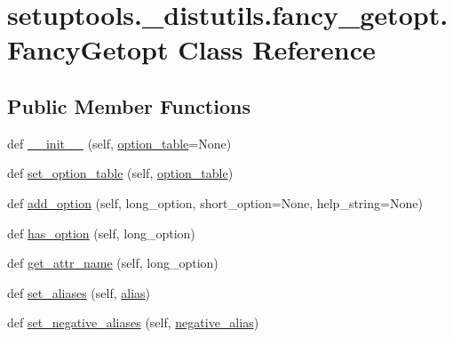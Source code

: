 \hypertarget{classsetuptools_1_1__distutils_1_1fancy__getopt_1_1FancyGetopt}{}\section{setuptools.\+\_\+distutils.\+fancy\+\_\+getopt.\+Fancy\+Getopt Class Reference}
\label{classsetuptools_1_1__distutils_1_1fancy__getopt_1_1FancyGetopt}
\subsection*{Public Member Functions}
\begin{DoxyCompactItemize}
\item 
def \hyperlink{classsetuptools_1_1__distutils_1_1fancy__getopt_1_1FancyGetopt_aff40839af86cf0e7fe54e1c28898233a}{\+\_\+\+\_\+init\+\_\+\+\_\+} (self, \hyperlink{classsetuptools_1_1__distutils_1_1fancy__getopt_1_1FancyGetopt_ab4341d9895b8b93f504df3dea529c456}{option\+\_\+table}=None)
\item 
def \hyperlink{classsetuptools_1_1__distutils_1_1fancy__getopt_1_1FancyGetopt_a9f44743f16a460a9e7b62b96ce50d96d}{set\+\_\+option\+\_\+table} (self, \hyperlink{classsetuptools_1_1__distutils_1_1fancy__getopt_1_1FancyGetopt_ab4341d9895b8b93f504df3dea529c456}{option\+\_\+table})
\item 
def \hyperlink{classsetuptools_1_1__distutils_1_1fancy__getopt_1_1FancyGetopt_a182bd660e389c85cdf1aeea64f9a17d1}{add\+\_\+option} (self, long\+\_\+option, short\+\_\+option=None, help\+\_\+string=None)
\item 
def \hyperlink{classsetuptools_1_1__distutils_1_1fancy__getopt_1_1FancyGetopt_a315138d5b201f19a34aeb424f73f6489}{has\+\_\+option} (self, long\+\_\+option)
\item 
def \hyperlink{classsetuptools_1_1__distutils_1_1fancy__getopt_1_1FancyGetopt_a0209c09aeffa422af6679ad056f43ef2}{get\+\_\+attr\+\_\+name} (self, long\+\_\+option)
\item 
def \hyperlink{classsetuptools_1_1__distutils_1_1fancy__getopt_1_1FancyGetopt_a6faf053b0ded2b40856b4842d85e329f}{set\+\_\+aliases} (self, \hyperlink{classsetuptools_1_1__distutils_1_1fancy__getopt_1_1FancyGetopt_a1b0493ab3037d6f1dbc4e6c41eeb4e67}{alias})
\item 
def \hyperlink{classsetuptools_1_1__distutils_1_1fancy__getopt_1_1FancyGetopt_afd3f307389796ef08c362d926f340b11}{set\+\_\+negative\+\_\+aliases} (self, \hyperlink{classsetuptools_1_1__distutils_1_1fancy__getopt_1_1FancyGetopt_a51b78fe538db39a624a7ef1934671959}{negative\+\_\+alias})

\end{DoxyCompactItemize}
